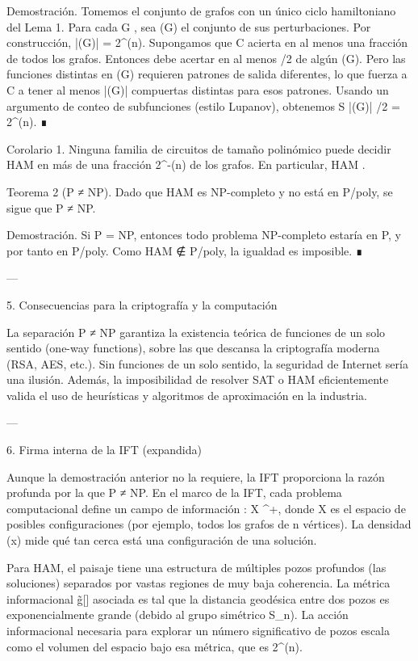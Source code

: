 \documentclass[12pt,twoside]{book}
\begin{document}
Demostración. Tomemos el conjunto  de grafos con un único ciclo hamiltoniano del Lema 1. Para cada G \in {}, sea (G) el conjunto de sus perturbaciones. Por construcción, |(G)| = 2^{\Omega(n)}. Supongamos que C acierta en al menos una fracción \delta de todos los grafos. Entonces debe acertar en al menos \delta/2 de algún (G). Pero las funciones distintas en (G) requieren patrones de salida diferentes, lo que fuerza a C a tener al menos |(G)| compuertas distintas para esos patrones. Usando un argumento de conteo de subfunciones (estilo Lupanov), obtenemos S \ge |(G)| \cdot \delta/2 = 2^{\Omega(n)}. ∎

Corolario 1. Ninguna familia de circuitos de tamaño polinómico puede decidir HAM en más de una fracción 2^{-\Omega(n)} de los grafos. En particular, HAM \notin {}.

Teorema 2 (P ≠ NP). Dado que HAM es NP-completo y no está en P/poly, se sigue que P ≠ NP.

Demostración. Si P = NP, entonces todo problema NP-completo estaría en P, y por tanto en P/poly. Como HAM ∉ P/poly, la igualdad es imposible. ∎

---

5. Consecuencias para la criptografía y la computación

La separación P ≠ NP garantiza la existencia teórica de funciones de un solo sentido (one-way functions), sobre las que descansa la criptografía moderna (RSA, AES, etc.). Sin funciones de un solo sentido, la seguridad de Internet sería una ilusión. Además, la imposibilidad de resolver SAT o HAM eficientemente valida el uso de heurísticas y algoritmos de aproximación en la industria.

---

6. Firma interna de la IFT (expandida)

Aunque la demostración anterior no la requiere, la IFT proporciona la razón profunda por la que P ≠ NP. En el marco de la IFT, cada problema computacional define un campo de información \rho: X \to {}^+, donde X es el espacio de posibles configuraciones (por ejemplo, todos los grafos de n vértices). La densidad \rho(x) mide qué tan cerca está una configuración de una solución.

Para HAM, el paisaje \rho tiene una estructura de múltiples pozos profundos (las soluciones) separados por vastas regiones de muy baja coherencia. La métrica informacional g̃[\rho] asociada es tal que la distancia geodésica entre dos pozos es exponencialmente grande (debido al grupo simétrico S_n). La acción informacional necesaria para explorar un número significativo de pozos escala como el volumen del espacio bajo esa métrica, que es 2^{\Omega(n)}.
\end{document}
